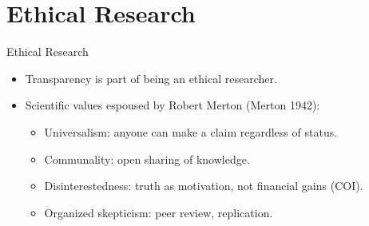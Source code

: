 \documentclass{beamer}
\begin{document}
{ %
    \begin{frame}[plain]
     \end{frame}
}
\section{Ethical Research}
\begin{frame}{Ethical Research}
\begin{itemize}
\item Transparency is part of being an ethical researcher. 

\item Scientific values espoused by Robert Merton (Merton 1942):
\begin{itemize}[<.->]
\item Universalism: anyone can make a claim regardless of status.
\item Communality: open sharing of knowledge.
\item Disinterestedness: truth as motivation, not financial gains (COI).
\item Organized skepticism: peer review, replication.
\end{itemize}
\end{itemize}
\end{frame}

\end{document}
